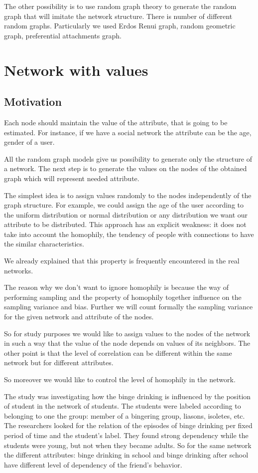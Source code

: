 \documentclass[12pt]{report}
\begin{document}
The other possibility is to use random graph theory to generate the random graph that will imitate the network structure. There is number of different random graphs. Particularly we used Erdos Renui graph, random geometric graph, preferential attachments graph.

\section{Network with values}

\subsection{Motivation}

Each node should maintain the value of the attribute, that is going to be estimated. For instance, if we have a social network the attribute can be the age, gender of a user.  

All the random graph models give us possibility to generate only the structure of a network. The next step is to generate the values on the nodes of the obtained graph which will represent needed attribute. 

The simplest idea is to assign values randomly to the nodes independently of the graph structure. For example, we could assign the age of the user according to the uniform distribution or normal distribution or any distribution we want our attribute to be distributed. This approach has an explicit weakness: it does not take into account the homophily, the tendency of people with connections to have the similar characteristics.

We already explained that this property is frequently encountered in the real networks.

The reason why we don't want to ignore homophily is because the way of performing sampling and the property of homophily together influence on the sampling variance and bias. Further we will count formally the sampling variance for the given network and attribute of the nodes.

So for study purposes we would like to assign values to the nodes of the network in such a way that the value of the node depends on values of its neighbors.
The other point is that the level of correlation can be different within the same network but for different attributes. 

So moreover we would like to control the level of homophily in the network. 

The study \cite{pollard2013adolescent} was investigating how the binge drinking is influenced by the position of student in the network of students. The students were labeled according to belonging to one the group: member of a bingering group, liasons, isoletes, etc. The researchers looked for the relation of the episodes of binge drinking per fixed period of time and the student's label. They found strong dependency while the students were young, but not when they became adults. So for the same network the different attributes: binge drinking in school and binge drinking after school have different level of dependency of the friend's behavior.
\end{document}
